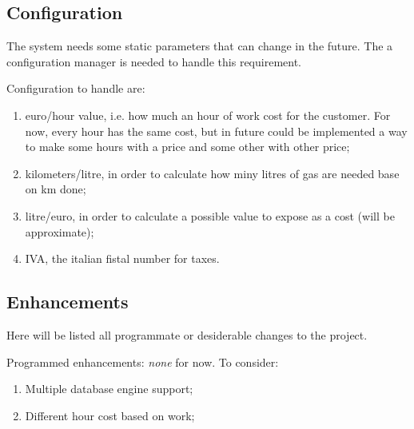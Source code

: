 \subsection{Configuration}
\label{subsec:configuration}
The system needs some static parameters that can change in the future. The a configuration manager is needed to handle this requirement.

Configuration to handle are:
\begin{enumerate}[label=(\alph*)]
\item euro/hour value, i.e. how much an hour of work cost for the customer. For now, every hour has the same cost, but in future could be implemented a way to make some hours with a price and some other with other price;
\item kilometers/litre, in order to calculate how miny litres of gas are needed base on km done;
\item litre/euro, in order to calculate a possible value to expose as a cost (will be approximate);
\item IVA, the italian fistal number for taxes.
\end{enumerate}


\subsection{Enhancements}
\label{subsec:enhancements}
Here will be listed all programmate or desiderable changes to the project.

Programmed enhancements: \textit{none} for now.
To consider: 
\begin{enumerate}[label=(\alph*)]
\item Multiple database engine support;
\item Different hour cost based on work;
\end{enumerate}
